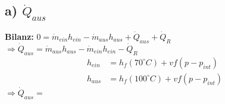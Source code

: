 \subsection*{a) $\dot{Q}_{aus}$}
\textbf{Bilanz:} $0 = \dot{m}_{ein} h_{ein} - \dot{m}_{aus} h_{aus} + \dot{Q}_{aus} + \dot{Q}_R$ \\
$\Rightarrow \dot{Q}_{aus} = \dot{m}_{aus} h_{aus} - \dot{m}_{ein} h_{ein} - \dot{Q}_R$ \\
\[
\begin{aligned}
    h_{ein} &= h_f (70^\circ C) + v f \left( p - p_{int} \right) \\
    h_{aus} &= h_f (100^\circ C) + v f \left( p - p_{int} \right)
\end{aligned}
\]
$\Rightarrow \dot{Q}_{aus} =$